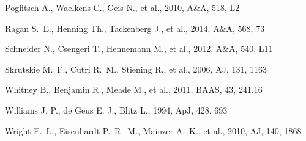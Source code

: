 \documentclass[iop]{emulateapj}
\begin{document}
\begin{thebibliography}{}
Poglitsch A., Waelkens C., Geis N., et al., 2010, A\&A, 518, L2

Ragan S.~E., Henning Th., Tackenberg J., et al., 2014, A\&A, 568, 73

Schneider N., Csengeri T., Hennemann M., et al., 2012, A\&A, 540, L11

Skrutskie M.~F., Cutri R.~M., Stiening R., et al., 2006, AJ, 131, 1163

Whitney B., Benjamin R., Meade M., et al., 2011, BAAS, 43, 241.16

Williams J. P., de Geus E. J., Blitz L., 1994, ApJ, 428, 693

Wright E.~L., Eisenhardt P.~R.~M., Mainzer A.~K., et al., 2010, AJ, 140, 1868
%
\end{thebibliography}
\end{document}
